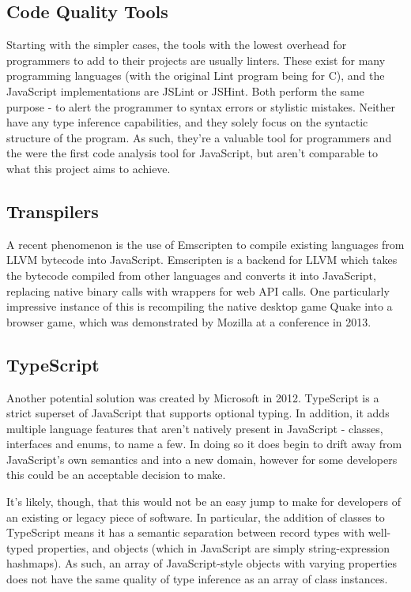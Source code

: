 \documentclass[british, twoside]{bhamthesis}
\theoremstyle{definition}
\begin{document}
  \subsection{Code Quality Tools}

    Starting with the simpler cases, the tools with the lowest overhead for programmers to add to their projects are usually linters. These exist for many programming languages (with the original Lint program being for C), and the JavaScript implementations are JSLint or JSHint. Both perform the same purpose - to alert the programmer to syntax errors or stylistic mistakes. Neither have any type inference capabilities, and they solely focus on the syntactic structure of the program. As such, they're a valuable tool for programmers and the were the first code analysis tool for JavaScript, but aren't comparable to what this project aims to achieve.

  \subsection{Transpilers}

    A recent phenomenon is the use of Emscripten\autocite{Zakai} to compile existing languages from LLVM bytecode into JavaScript. Emscripten is a backend for LLVM which takes the bytecode compiled from other languages and converts it into JavaScript, replacing native binary calls with wrappers for web API calls. One particularly impressive instance of this is recompiling the native desktop game Quake into a browser game, which was demonstrated by Mozilla at a conference in 2013\autocite{unrealengine}.

  \subsection{TypeScript}

    Another potential solution was created by Microsoft in 2012. TypeScript is a strict superset of JavaScript that supports optional typing. In addition, it adds multiple language features that aren't natively present in JavaScript - classes, interfaces and enums, to name a few. In doing so it does begin to drift away from JavaScript's own semantics and into a new domain, however for some developers this could be an acceptable decision to make.

    It's likely, though, that this would not be an easy jump to make for developers of an existing or legacy piece of software. In particular, the addition of classes to TypeScript means it has a semantic separation between record types with well-typed properties, and objects (which in JavaScript are simply string-expression hashmaps). As such, an array of JavaScript-style objects with varying properties does not have the same quality of type inference as an array of class instances.
\end{document}
